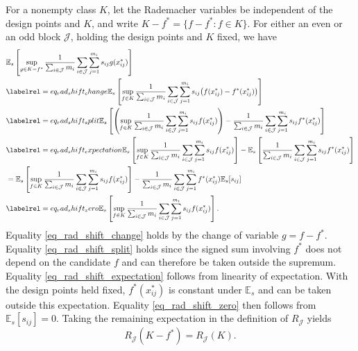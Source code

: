 \documentclass[twoside,11pt]{article}
\newenvironment{revision}{\color{revisionred}}{}
\begin{document}
\begin{revision}
For a nonempty class $K$, let the Rademacher variables be independent
of the design points and $K$, and write
$K-f^*=\{f-f^*:f\in K\}$.
For either an even or an odd block $\mathcal J$, holding the design
points and $K$ fixed, we have
\begin{align*}
&\mathbb{E}_s\left[
\sup_{g\in K-f^*}
\frac{1}{\sum_{i\in\mathcal J}m_i}
\sum_{i\in\mathcal J}\sum_{j=1}^{m_i}
s_{ij}g(x_{ij}^*)
\right]\\
&\labelrel = {eq_rad_shift_change}
\mathbb{E}_s\left[
\sup_{f\in K}
\frac{1}{\sum_{i\in\mathcal J}m_i}
\sum_{i\in\mathcal J}\sum_{j=1}^{m_i}
s_{ij}\bigl(f(x_{ij}^*)-f^*(x_{ij}^*)\bigr)
\right]\\
&\labelrel = {eq_rad_shift_split}
\mathbb{E}_s\left[
\left(
\sup_{f\in K}
\frac{1}{\sum_{i\in\mathcal J}m_i}
\sum_{i\in\mathcal J}\sum_{j=1}^{m_i}
s_{ij}f(x_{ij}^*)
\right)
-
\frac{1}{\sum_{i\in\mathcal J}m_i}
\sum_{i\in\mathcal J}\sum_{j=1}^{m_i}
s_{ij}f^*(x_{ij}^*)
\right]\\
&\labelrel = {eq_rad_shift_expectation}
\mathbb{E}_s\left[
\sup_{f\in K}
\frac{1}{\sum_{i\in\mathcal J}m_i}
\sum_{i\in\mathcal J}\sum_{j=1}^{m_i}
s_{ij}f(x_{ij}^*)
\right]
-
\mathbb{E}_s\left[
\frac{1}{\sum_{i\in\mathcal J}m_i}
\sum_{i\in\mathcal J}\sum_{j=1}^{m_i}
s_{ij}f^*(x_{ij}^*)
\right]\\
&=
\mathbb{E}_s\left[
\sup_{f\in K}
\frac{1}{\sum_{i\in\mathcal J}m_i}
\sum_{i\in\mathcal J}\sum_{j=1}^{m_i}
s_{ij}f(x_{ij}^*)
\right]
-
\frac{1}{\sum_{i\in\mathcal J}m_i}
\sum_{i\in\mathcal J}\sum_{j=1}^{m_i}
f^*(x_{ij}^*)\mathbb{E}_s[s_{ij}]\\
&\labelrel = {eq_rad_shift_zero}
\mathbb{E}_s\left[
\sup_{f\in K}
\frac{1}{\sum_{i\in\mathcal J}m_i}
\sum_{i\in\mathcal J}\sum_{j=1}^{m_i}
s_{ij}f(x_{ij}^*)
\right].
\end{align*}
Equality \eqref{eq_rad_shift_change} holds by the change of variable
$g=f-f^*$.
Equality \eqref{eq_rad_shift_split} holds since the signed sum
involving $f^*$ does not depend on the candidate $f$ and can
therefore be taken outside the supremum.
Equality \eqref{eq_rad_shift_expectation} follows from linearity
of expectation. With the design points held fixed,
$f^*(x_{ij}^*)$ is constant under $\mathbb{E}_s$ and can be taken
outside this expectation.
Equality \eqref{eq_rad_shift_zero} then follows from
$\mathbb{E}_s[s_{ij}]=0$.
Taking the remaining expectation in the definition of
$R_{\mathcal J}$ yields
\begin{equation}
\label{eq_rademacher_translation}
R_{\mathcal J}(K-f^*)=R_{\mathcal J}(K).
\end{equation}


\end{revision}
\end{document}
